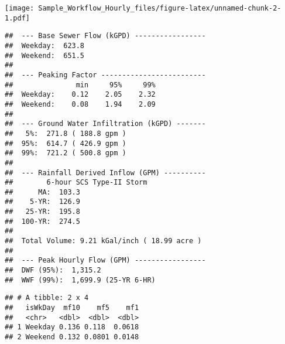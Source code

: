 \documentclass[]{article}
\title{}
\author{}
\date{}
\begin{document}

\texttt{[image: Sample\_Workflow\_Hourly\_files/figure-latex/unnamed-chunk-2-1.pdf]}

\begin{verbatim}
##  --- Base Sewer Flow (kGPD) ----------------- 
##  Weekday:  623.8 
##  Weekend:  651.5 
##  
##  --- Peaking Factor ------------------------- 
##               min     95%     99% 
##  Weekday:    0.12    2.05    2.32 
##  Weekend:    0.08    1.94    2.09 
##  
##  --- Ground Water Infiltration (kGPD) ------- 
##   5%:  271.8 ( 188.8 gpm ) 
##  95%:  614.7 ( 426.9 gpm ) 
##  99%:  721.2 ( 500.8 gpm ) 
##  
##  --- Rainfall Derived Inflow (GPM) ---------- 
##        6-hour SCS Type-II Storm 
##      MA:  103.3 
##    5-YR:  126.9 
##   25-YR:  195.8 
##  100-YR:  274.5 
##  
##  Total Volume: 9.21 kGal/inch ( 18.99 acre ) 
##  
##  --- Peak Hourly Flow (GPM) ----------------- 
##  DWF (95%):  1,315.2 
##  WWF (99%):  1,699.9 (25-YR 6-HR)
\end{verbatim}

\begin{verbatim}
## # A tibble: 2 x 4
##   isWkDay  mf10    mf5    mf1
##   <chr>   <dbl>  <dbl>  <dbl>
## 1 Weekday 0.136 0.118  0.0618
## 2 Weekend 0.132 0.0801 0.0148
\end{verbatim}
\end{document}
